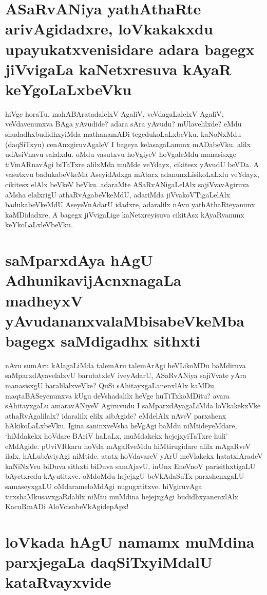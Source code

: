 \section*{ASaRvANiya yathAthaRte arivAgidadxre, loVkakakxdu upayukatxvenisidare adara bagegx jiVvigaLa kaNetxresuva kAyaR keYgoLaLxbeVku}

hiVge horaTu, mahABAratadalelxV AgaliV, veVdagaLalelxV AgaliV, veVdavenunxva BAga yAvudide? adara sAra yAvudu? mUlavelilxde? eMdu shudadhxbudidhxyiMda mathanamADi tegedukoLaLxbeVku. kaNoNxMdu (daqSiTxyu) cenAnxgiruvAgaleV I bageya kelasagaLanunx mADabeVku. alilx udAsiVnavu salalxdu. oMdu vasutxvu hoVgiyeV hoVgaleMdu manasisxge tiVmARnavAgi biTaTxre alilxMda muMde veYdayx, cikitesx yAvudU beVDa. A vasutxvu badukabeVkeMa AseyidAdxga mAtarx adanunxLisikoLaLxlu veYdayx, cikitesx elAlx beVkeV beVku. adaraMte ASaRvANigaLelAlx sajiVvavAgiruva aMsha elalxrigU athaRvAgabeVkeMdU, adariMda jiVvakoVTigaLelAlx badukabeVkeMdU AseyeVnAdarU idadxre, adaralilx nAvu yathAthaRteyanunx kaMDidadxre, A bagegx jiVvigaLige kaNetxreyisuva cikitAsx kAyaRvanunx keYkoLaLxleVbeVku.

\section*{saMparxdAya hAgU AdhunikavijAcnxnagaLa madheyxV yAvudananxvalaMbisabeVkeMba bagegx saMdigadhx sithxti}

nAvu sumAru kAlagaLiMda talemAru talemArAgi heVLikoMDu baMdiruva saMparxdAyavelalxvU barutatxleV iveyAdarU, ASaRvANiya sajiVvate yAra manasisxgU baralilalxveVke? QuSi sAhitayxgaLanenxlAlx kaMDu maqtaBASeyenunxva kUgu deVshadalilx heVge huTiTxkoMDitu? avara sAhitayxgaLu amaravANiyeV Agiruvudu I saMparxdAyagaLiMda loVkakekxVke athaRvAgalilalx? idaralilx elilx aibAgide? eMdelAlx nAveV parxshenx hAkikoLaLxbeVku. Igina saninxveVsha heVgAgi baMdu niMtideyeMdare, `hiMdakekx hoVdare BAriV haLaLx, muMdakekx hejejxyiTaTxre huli'  eMdAgide. pUviVRkaru hoVda mAgaRveMdu hiMtirugidare alilx mAgaRveV ilalx. hALubAviyAgi niMtide. atatx hoVdavareV yArU meVlakekx hatatxlAradeV kaNiNxVru biDuva sithxti biDuva samAjavU, inUnx EneVnoV parisithxtigaLU bAyetxredu kAyutitxve. oMdoMdu hejejxgU beVkAdaSuTx parxshenxgaLU samaseyxgaLU oMdarameloMdAgi nugugxtitxve. hiVgiruvAga tirxshaMkusavxgaRdalilx niMtu muMdina hejejxgAgi budidhxyanenxlAlx KacuRmADi AloVcisabeVkAgidepApx!

\section*{loVkada hAgU namamx muMdina parxjegaLa daqSiTxyiMdalU kataRvayxvide}

